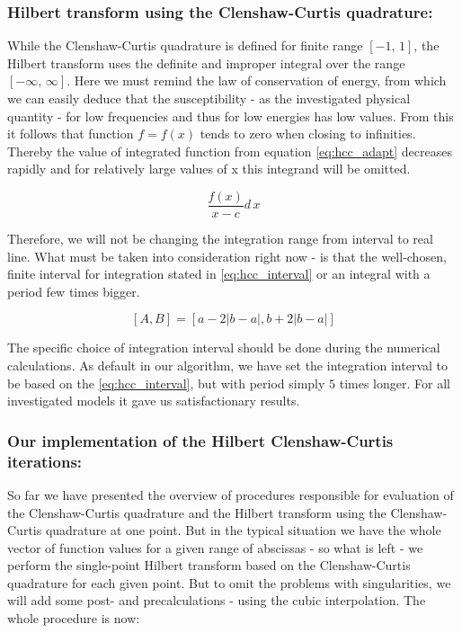 \documentclass[12pt,twoside,a4paper]{article}
\numberwithin{equation}{subsection}
\numberwithin{figure}{subsection}
\begin{document}
\subsubsection*{Hilbert transform using the Clenshaw-Curtis quadrature:}

While the Clenshaw-Curtis quadrature is defined for finite range $[-1,\,1]$, the Hilbert transform uses the definite and improper
integral over the range $[-\infty,\, \infty]$. Here we must remind the law of conservation of energy, from which we can easily
deduce that the susceptibility - as the investigated physical quantity - for low frequencies and thus for low energies has low
values. From this it follows that function $f = f(x)$ tends to zero when closing to infinities. Thereby the value of integrated
function from equation \ref{eq:hcc_adapt} decreases rapidly and for relatively large values of x this integrand will be omitted.

\begin{equation} \label{eq:hcc_adapt}
  \frac{f(x)}{x-c} d \, x
\end{equation}

Therefore, we will not be changing the integration range from interval to real line. What must be taken into consideration right
now - is that the well-chosen, finite interval for integration stated in \ref{eq:hcc_interval} or an integral with a period few times bigger.

\begin{equation} \label{eq:hcc_interval}
  [A, B] = [a - 2|b-a|, b + 2|b-a|] 
\end{equation}

The specific choice of integration interval should be done during the numerical calculations. As default in our algorithm, we have
set the integration interval to be based on the \ref{eq:hcc_interval}, but with period simply $5$ times longer. For all
investigated models it gave us satisfactionary results.

\subsubsection*{Our implementation of the Hilbert Clenshaw-Curtis iterations:}

So far we have presented the overview of procedures responsible for evaluation of the Clenshaw-Curtis qua\-dra\-tu\-re and the Hil\-bert
transform using the Clenshaw-Curtis qua\-dra\-ture at one point. But in the typical situation we have the whole vector of function values
for a given range of abscissas - so what is left - we perform the single-point Hil\-bert transform based on the Clenshaw-Curtis
qua\-dra\-ture for each given point. But to omit the problems with singularities, we will add some post- and precalculations - using the cubic interpolation. The
whole procedure is now:
\end{document}
